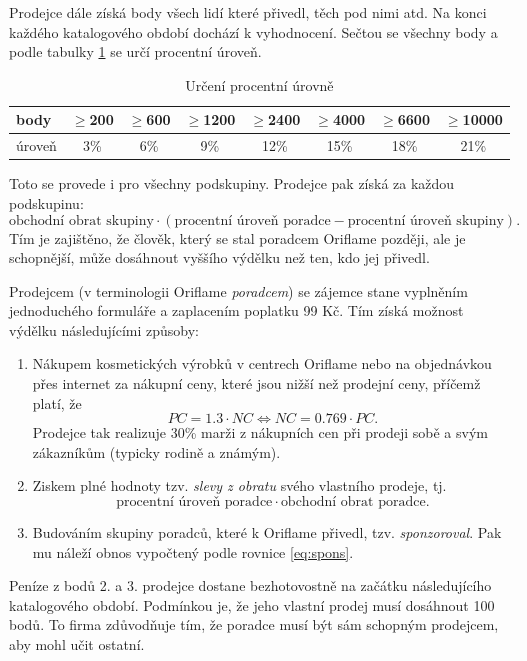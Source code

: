 \documentclass[a4wide,12pt]{report}
\begin{document}
Prodejce dále získá body všech lidí které přivedl, těch pod nimi atd. Na konci každého katalogového období dochází k vyhodnocení. Sečtou se všechny body a podle tabulky \ref{tab:perc_level} se určí procentní úroveň.
\begin{table}[htb]
\begin{center}
\begin{tabular}{|l|c|c|c|c|c|c|c|}
\hline
body & $\geq$200 & $\geq$600 & $\geq$1200 & $\geq$2400 & $\geq$4000 & $\geq$6600& $\geq$10000\\\hline
úroveň & 3\% & 6\% & 9\% & 12\% & 15\% & 18\% & 21\%\\\hline
\end{tabular}
\end{center}
\caption{Určení procentní úrovně}
\label{tab:perc_level}
\end{table}
Toto se provede i pro všechny podskupiny. Prodejce pak získá za každou podskupinu:
\begin{equation} \label{eq:spons}
\text{obchodní obrat skupiny} \cdot (\text{procentní úroveň poradce} - \text{procentní úroveň skupiny}).
\end{equation}
Tím je zajištěno, že člověk, který se stal poradcem Oriflame později, ale je schopnější, může dosáhnout vyššího výdělku než ten, kdo jej přivedl.

Prodejcem (v terminologii Oriflame \emph{poradcem}) se zájemce stane vyplněním jednoduchého formuláře a zaplacením poplatku 99 Kč. Tím získá možnost výdělku následujícími způsoby:
\begin{enumerate}
\item Nákupem kosmetických výrobků v centrech Oriflame nebo na objednávkou přes internet za nákupní ceny, které jsou nižší než prodejní ceny, příčemž platí, že
\begin{equation} \label{eq:pcnc}
PC=1.3 \cdot NC \Leftrightarrow NC = 0.769 \cdot PC.
\end{equation}
Prodejce tak realizuje 30\% marži z nákupních cen při prodeji sobě a svým zákazníkům (typicky rodině a známým).
\item Ziskem plné hodnoty tzv. \emph{slevy z obratu} svého vlastního prodeje, tj.
\begin{equation} \label{eq:so}
\text{procentní úroveň poradce} \cdot \text{obchodní obrat poradce}.
\end{equation}
\item Budováním skupiny poradců, které k Oriflame přivedl, tzv. \emph{sponzoroval}. Pak mu náleží obnos vypočtený podle rovnice \ref{eq:spons}.
\end{enumerate}
Peníze z bodů 2. a 3. prodejce dostane bezhotovostně na začátku následujícího katalogového období. Podmínkou je, že jeho vlastní prodej musí dosáhnout 100 bodů. To firma zdůvodňuje tím, že poradce musí být sám schopným prodejcem, aby mohl učit ostatní.
\end{document}
